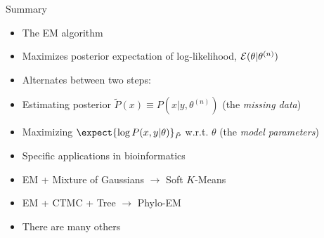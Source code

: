\documentclass{beamer}
\begin{document}
\begin{frame}{Summary}

  \begin{itemize}
  \item The EM algorithm
   \itemb
   \item Maximizes posterior expectation of log-likelihood, ${\cal E}(\theta|\theta^{(n)})$
   \item Alternates between two steps:
   \itemb
    \item \alert{E}stimating posterior $\tilde{P}(x) \equiv P(x|y,\theta^{(n)})$ (the \alert{\em missing data})
    \item \alert{M}aximizing $\expect{\log P(x,y|\theta)}_{\tilde{P}}$ w.r.t. $\theta$ (the \alert{\em model parameters})
   \iteme
   \iteme
  \item Specific applications in bioinformatics
   \itemb
   \item EM + Mixture of Gaussians $\to$ Soft $K$-Means
   \item EM + CTMC + Tree $\to$ Phylo-EM
   \item There are many others
   \iteme
  \end{itemize}

\end{frame}
\end{document}
